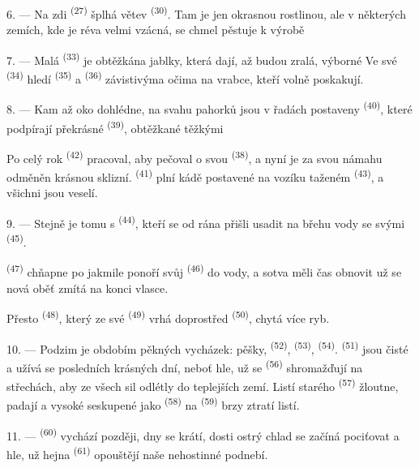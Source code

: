 6. --- Na zdi  \textsuperscript{(27)} šplhá větev 
\textsuperscript{(30)}. Tam je jen okrasnou rostlinou, ale v některých zemích, kde je
réva velmi vzácná, se chmel pěstuje k výrobě 

7. --- Malá  \textsuperscript{(33)} je obtěžkána jablky, která dají, až
budou zralá, výborné  Ve své 
\textsuperscript{(34)} hledí  \textsuperscript{(35)} a 
\textsuperscript{(36)} závistivýma očima na vrabce, kteří volně poskakují.

8. --- Kam až oko dohlédne, na svahu pahorků jsou v řadách postaveny  \textsuperscript{(40)}, které podpírají překrásné 
\textsuperscript{(39)}, obtěžkané těžkými 

Po celý rok  \textsuperscript{(42)} pracoval, aby pečoval o svou
 \textsuperscript{(38)}, a nyní je za svou námahu odměněn krásnou
sklizní.  \textsuperscript{(41)} plní kádě postavené na vozíku taženém
 \textsuperscript{(43)}, a všichni jsou veselí.

\VUsaut{5.0mm}
\VUsaut{3.4mm}

9. --- Stejně je tomu s  \textsuperscript{(44)}, kteří se od
rána přišli usadit na břehu vody se svými  \textsuperscript{(45)}.

 \textsuperscript{(47)} chňapne po  jakmile ponoří svůj
 \textsuperscript{(46)} do vody, a sotva měli čas obnovit
 už se nová oběť zmítá na konci vlasce.

Přesto  \textsuperscript{(48)}, který ze své 
\textsuperscript{(49)} vrhá  doprostřed 
\textsuperscript{(50)}, chytá více ryb.

10. --- Podzim je obdobím pěkných vycházek: pěšky, 
\textsuperscript{(52)},  \textsuperscript{(53)}, 
\textsuperscript{(54)}.  \textsuperscript{(51)} jsou čisté a užívá se
posledních krásných dní, neboť hle, už se 
\textsuperscript{(56)} shromažďují na střechách, aby ze všech sil odlétly do teplejších
zemí. Listí starého  \textsuperscript{(57)} žloutne, 
padají a vysoké  seskupené jako 
\textsuperscript{(58)} na  \textsuperscript{(59)} brzy ztratí listí.

11. ---  \textsuperscript{(60)} vychází později, dny se krátí, dosti
ostrý chlad se začíná pociťovat  a hle, už hejna 
\textsuperscript{(61)} opouštějí naše nehostinné podnebí.
